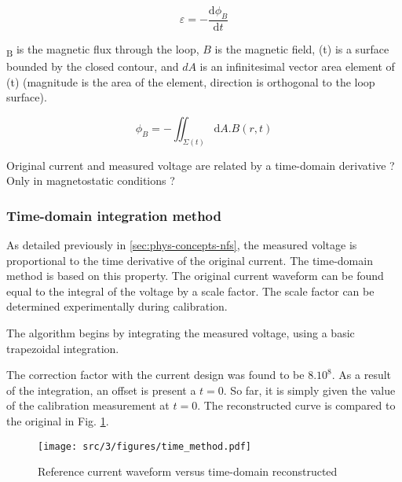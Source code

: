 \begin{equation} \label{eq:faraday}
  \varepsilon = - \frac{\mathrm{d} \phi _{B}}{\mathrm{d} t}
\end{equation}


\textPhi{}\textsubscript{B} is the magnetic flux through the loop, $B$ is the magnetic field, \textSigma{}(t) is a surface bounded by the closed contour,
and $dA$ is an infinitesimal vector area element of \textSigma{}(t) (magnitude is the area of the element, direction is orthogonal to the loop surface).

\begin{equation} \label{eq:phi}
  \phi _{B} = - \iint_{\Sigma(t)} \mathrm{d}A . B(r,t)
\end{equation}

Original current and measured voltage are related by a time-domain derivative ? Only in magnetostatic conditions ?

\subsubsection{Time-domain integration method}

As detailed previously in \ref{sec:phys-concepts-nfs}, the measured voltage is proportional to the time derivative of the original current.
The time-domain method is based on this property.
The original current waveform can be found equal to the integral of the voltage by a scale factor.
The scale factor can be determined experimentally during calibration.


The algorithm begins by integrating the measured voltage, using a basic trapezoidal integration.

The correction factor with the current design was found to be $8.10^8$.
As a result of the integration, an offset is present a $t=0$.
So far, it is simply given the value of the calibration measurement at $t=0$.
The reconstructed curve is compared to the original in Fig. \ref{fig:time-domain-reconstructed}.

\begin{figure}[!htbp]
  \centering
  \texttt{[image: src/3/figures/time\_method.pdf]}
  \caption{Reference current waveform versus time-domain reconstructed}
  \label{fig:time-domain-reconstructed}
\end{figure}

